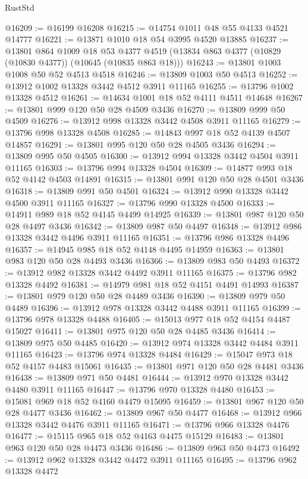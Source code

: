 \begin{lexlean}{RustStd}
\begin{coremodule}
@16209 := @16199 @16208
@16215 := @14754 @1011 @48 @55 @4133 @4521 @14777
@16221 := @13871 @1010 @18 @54 @3995 @4520 @13885
@16237 := @13801
    @864
    @1009
    @18
    @53
    @4377
    @4519
    (@13834 @863 @4377 (@10829 (@10830 @4377)) (@10645 (@10835 @863 @18)))
@16243 := @13801 @1003 @1008 @50 @52 @4513 @4518
@16246 := @13809 @1003 @50 @4513
@16252 := @13912 @1002 @13328 @3442 @4512 @3911 @11165
@16255 := @13796 @1002 @13328 @4512
@16261 := @14634 @1001 @18 @52 @4111 @4511 @14648
@16267 := @13801 @999 @120 @50 @28 @4509 @3436
@16270 := @13809 @999 @50 @4509
@16276 := @13912 @998 @13328 @3442 @4508 @3911 @11165
@16279 := @13796 @998 @13328 @4508
@16285 := @14843 @997 @18 @52 @4139 @4507 @14857
@16291 := @13801 @995 @120 @50 @28 @4505 @3436
@16294 := @13809 @995 @50 @4505
@16300 := @13912 @994 @13328 @3442 @4504 @3911 @11165
@16303 := @13796 @994 @13328 @4504
@16309 := @14877 @993 @18 @52 @4142 @4503 @14891
@16315 := @13801 @991 @120 @50 @28 @4501 @3436
@16318 := @13809 @991 @50 @4501
@16324 := @13912 @990 @13328 @3442 @4500 @3911 @11165
@16327 := @13796 @990 @13328 @4500
@16333 := @14911 @989 @18 @52 @4145 @4499 @14925
@16339 := @13801 @987 @120 @50 @28 @4497 @3436
@16342 := @13809 @987 @50 @4497
@16348 := @13912 @986 @13328 @3442 @4496 @3911 @11165
@16351 := @13796 @986 @13328 @4496
@16357 := @14945 @985 @18 @52 @4148 @4495 @14959
@16363 := @13801 @983 @120 @50 @28 @4493 @3436
@16366 := @13809 @983 @50 @4493
@16372 := @13912 @982 @13328 @3442 @4492 @3911 @11165
@16375 := @13796 @982 @13328 @4492
@16381 := @14979 @981 @18 @52 @4151 @4491 @14993
@16387 := @13801 @979 @120 @50 @28 @4489 @3436
@16390 := @13809 @979 @50 @4489
@16396 := @13912 @978 @13328 @3442 @4488 @3911 @11165
@16399 := @13796 @978 @13328 @4488
@16405 := @15013 @977 @18 @52 @4154 @4487 @15027
@16411 := @13801 @975 @120 @50 @28 @4485 @3436
@16414 := @13809 @975 @50 @4485
@16420 := @13912 @974 @13328 @3442 @4484 @3911 @11165
@16423 := @13796 @974 @13328 @4484
@16429 := @15047 @973 @18 @52 @4157 @4483 @15061
@16435 := @13801 @971 @120 @50 @28 @4481 @3436
@16438 := @13809 @971 @50 @4481
@16444 := @13912 @970 @13328 @3442 @4480 @3911 @11165
@16447 := @13796 @970 @13328 @4480
@16453 := @15081 @969 @18 @52 @4160 @4479 @15095
@16459 := @13801 @967 @120 @50 @28 @4477 @3436
@16462 := @13809 @967 @50 @4477
@16468 := @13912 @966 @13328 @3442 @4476 @3911 @11165
@16471 := @13796 @966 @13328 @4476
@16477 := @15115 @965 @18 @52 @4163 @4475 @15129
@16483 := @13801 @963 @120 @50 @28 @4473 @3436
@16486 := @13809 @963 @50 @4473
@16492 := @13912 @962 @13328 @3442 @4472 @3911 @11165
@16495 := @13796 @962 @13328 @4472

\end{coremodule}
\end{lexlean}
